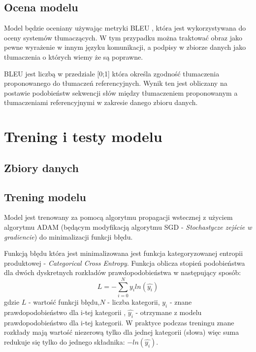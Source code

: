\subsection{Ocena modelu}
Model będzie oceniany używając metryki BLEU \cite{BLEU}, która jest wykorzystywana do oceny systemów tłumaczących. W tym przypadku można traktować
obraz jako pewne wyrażenie w innym języku komunikacji, a podpisy w zbiorze danych jako tłumaczenia o których wiemy że są poprawne.

BLEU jest liczbą w przedziale [0;1] która określa zgodność tłumaczenia proponowanego do tłumaczeń referencyjnych.
Wynik ten jest obliczany na postawie podobieństw sekwencji słów między tłumaczeniem proponowanym a tłumaczeniami referencyjnymi w zakresie danego zbioru danych.

\section{Trening i testy modelu}
\subsection{Zbiory danych}

\subsection{Trening modelu}
Model jest trenowany za pomocą algorytmu propagacji wstecznej \cite{BackProp} z użyciem algorytmu ADAM \cite{ADAM} (będącym modyfikacją algorytmu SGD - \textit{Stochastycze zejście w gradiencie}) do minimalizacji funkcji błędu.

Funkcją błędu która jest minimalizowana jest funkcja kategoryzowanej entropii produktowej - \textit{Categorical Cross Entropy}. Funkcja oblicza stopień podobieństwa dla dwóch dyskretnych rozkładów prawdopodobieństwa w następujący sposób: 
\begin{equation*}
L = - \sum_{i=0}^N y_iln(\hat{y_i})
\end{equation*}
gdzie $L$ - wartość funkcji błędu,$N$ - liczba kategorii, $y_i$ - znane prawdopodobieństwo dla i-tej kategorii , $\hat{y_i}$ - otrzymane z modelu prawdopodobieństwo dla i-tej kategorii. W praktyce podczas treningu znane rozkłady mają wartość niezerową tylko dla jednej kategorii (słowa) więc suma redukuje się tylko do jednego składnika: $-ln(\hat{y_i})$.

